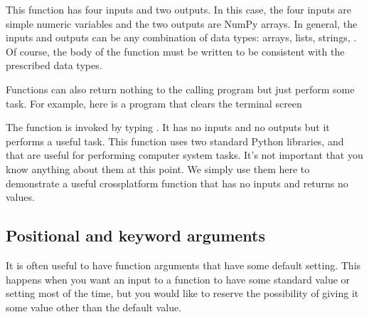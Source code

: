 \documentclass[letterpaper,10pt,english]{sphinxmanual}
\begin{document}
\sphinxAtStartPar
This function has four inputs and two outputs.  In this case, the four inputs are simple numeric variables and the two outputs are NumPy arrays.  In general, the inputs and outputs can be any combination of data types: arrays, lists, strings, . Of course, the body of the function must be written to be consistent with the prescribed data types.

\sphinxAtStartPar
Functions can also return nothing to the calling program but just perform some task.  For example, here is a program that clears the terminal screen

\begin{sphinxVerbatim}[commandchars=\\\{\},numbers=left,firstnumber=1,stepnumber=1]
 
 

 
        
                         
\end{sphinxVerbatim}

\sphinxAtStartPar
The function is invoked by typing .  It has no inputs and no outputs but it performs a useful task.  This function uses two standard Python libraries,  and  that are useful for performing computer system tasks.  It’s not important that you know anything about them at this point.  We simply use them here to demonstrate a useful cross\sphinxhyphen{}platform function that has no inputs and returns no values.

\ignorespaces 

\subsection{Positional and keyword arguments}
\label{\detokenize{chap7/chap7_funcs:positional-and-keyword-arguments}}\label{\detokenize{chap7/chap7_funcs:index-3}}
\sphinxAtStartPar
It is often useful to have function arguments that have some default setting.  This happens when you want an input to a function to have some standard value or setting most of the time, but you would like to reserve the possibility of giving it some value other than the default value.
\end{document}
